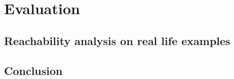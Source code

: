 \chapter{Evaluation}
\label{sec:verifikacio}

\section{Reachability analysis on real life examples}



\section{Conclusion}

